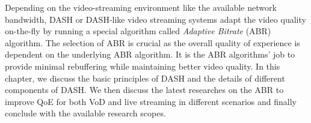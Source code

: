 Depending on the video-streaming environment like the available network bandwidth, DASH or DASH-like video streaming systems adapt the video quality on-the-fly by running a special algorithm called \textit{Adaptive Bitrate} (ABR) algorithm. The selection of ABR is crucial as the overall quality of experience is dependent on the underlying ABR algorithm. It is the ABR algorithms' job to provide minimal rebuffering while maintaining better video quality. In this chapter, we discuss the basic principles of DASH and the details of different components of DASH.  We then discuss the latest researches on the ABR to improve QoE for both VoD and live streaming in different scenarios and finally conclude with the available research scopes.

